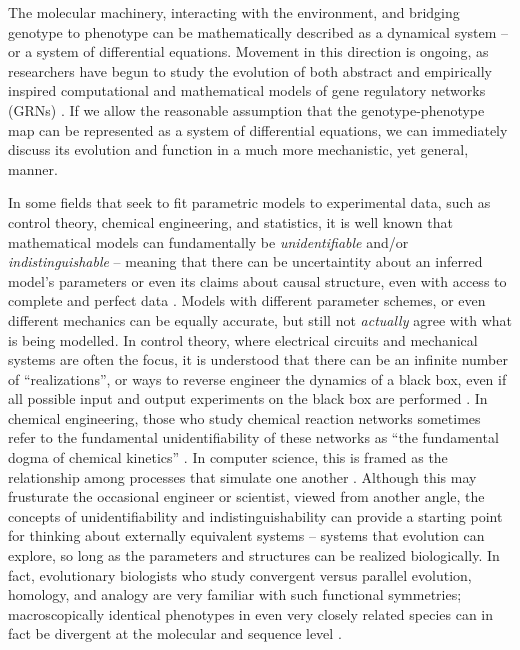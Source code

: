 \documentclass[9 pt]{article}
\newcommand{\1}{\mathbbm{1}}
\begin{document}
The molecular machinery, interacting with the environment, and bridging genotype to phenotype
can be mathematically described as a dynamical system -- or a system of differential equations\citep{jaeger2015comet}.
 Movement in this direction is ongoing, as researchers have begun to study 
the evolution of both abstract \citep{wagner1994evolution, wagner1996does,  siegal2002waddington, bergman2003evolutionary, draghi2015robustness} and empirically inspired computational and mathematical models of gene regulatory networks (GRNs) \citep{mjolsness1991connectionist, jaeger2004dynamic, maria1, vitaly1, vitaly2, crombach2016gap, wotton2015quantitative, chertkova2017insilico}. If we allow the reasonable assumption that the genotype-phenotype map can be represented as a system of differential equations, we can immediately discuss its evolution and function in a much more mechanistic, yet general, manner. 

In some fields that seek to fit parametric models to experimental data, such as control
theory, chemical engineering, and statistics, it is well known that mathematical models
can fundamentally be \emph{unidentifiable} and/or \emph{indistinguishable} -- meaning that 
there can be uncertaintity about an inferred model's parameters or even its claims about
causal structure, even with access to complete and perfect data \citep{bellman1970structural, grewal1976identifiability, walter1984structural}. Models with different 
parameter schemes, or even different mechanics can be equally accurate, but still not
\emph{actually} agree with what is being modelled. In control theory, where electrical 
circuits and mechanical systems are often the focus, it is understood that there can be an 
infinite number of ``realizations'', or ways to reverse engineer the dynamics of a black box,
even if all possible input and output experiments on the black box are performed \citep{kalman1963mathematical, anderson1966equivalence, zadeh1976linear}. In chemical
engineering, those who study chemical reaction networks sometimes refer to the fundamental
unidentifiability of these networks as ``the fundamental dogma of chemical kinetics'' \citep{craciun2008identifiability}. In computer science, this is framed as the relationship among processes that simulate one another \citep{van2004equivalence}.
Although this may frusturate the occasional engineer or scientist, viewed from another angle,
the concepts of unidentifiability and indistinguishability can provide a starting point for
thinking about externally equivalent systems -- systems that evolution can explore, so long
as the parameters and structures can be realized biologically. In fact, evolutionary
biologists who study convergent versus parallel evolution, homology, and analogy are very familiar with such functional symmetries; macroscopically identical phenotypes in even very closely related species can in fact be divergent at the molecular and sequence level \citep{true2001developmental, tsong2006evolution, hare2008sepsid, vierstra2014mouse, stergachis2014conservation, taylor2016diverse, matsui2015regulatory}.
\end{document}
